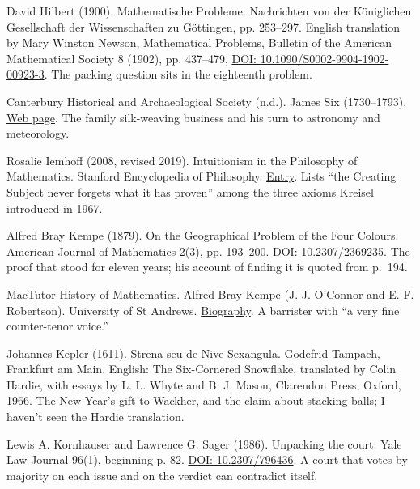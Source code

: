 \noindent David Hilbert (1900). Mathematische Probleme. Nachrichten von der K\"oniglichen Gesellschaft der Wissenschaften zu G\"ottingen, pp. 253--297. English translation by Mary Winston Newson, Mathematical Problems, Bulletin of the American Mathematical Society 8 (1902), pp. 437--479, \href{https://doi.org/10.1090/S0002-9904-1902-00923-3}{DOI: 10.1090/S0002-9904-1902-00923-3}. The packing question sits in the eighteenth problem.
\par\medskip

\noindent Canterbury Historical and Archaeological Society (n.d.). James Six (1730--1793). \href{https://www.canterbury-archaeology.org.uk/six-james-biog}{Web page}. The family silk-weaving business and his turn to astronomy and meteorology.
\par\medskip

\noindent Rosalie Iemhoff (2008, revised 2019). Intuitionism in the Philosophy of Mathematics. Stanford Encyclopedia of Philosophy. \href{https://plato.stanford.edu/entries/intuitionism/}{Entry}. Lists ``the Creating Subject never forgets what it has proven'' among the three axioms Kreisel introduced in 1967.
\par\medskip

\noindent Alfred Bray Kempe (1879). On the Geographical Problem of the Four Colours. American Journal of Mathematics 2(3), pp. 193--200. \href{https://doi.org/10.2307/2369235}{DOI: 10.2307/2369235}. The proof that stood for eleven years; his account of finding it is quoted from p.~194.
\par\medskip

\noindent MacTutor History of Mathematics. Alfred Bray Kempe (J. J. O'Connor and E. F. Robertson). University of St Andrews. \href{https://mathshistory.st-andrews.ac.uk/Biographies/Kempe/}{Biography}. A barrister with ``a very fine counter-tenor voice.''
\par\medskip

\noindent Johannes Kepler (1611). Strena seu de Nive Sexangula. Godefrid Tampach, Frankfurt am Main. English: The Six-Cornered Snowflake, translated by Colin Hardie, with essays by L. L. Whyte and B. J. Mason, Clarendon Press, Oxford, 1966. The New Year's gift to Wackher, and the claim about stacking balls; I haven't seen the Hardie translation.
\par\medskip

\noindent Lewis A. Kornhauser and Lawrence G. Sager (1986). Unpacking the court. Yale Law Journal 96(1), beginning p. 82. \href{https://doi.org/10.2307/796436}{DOI: 10.2307/796436}. A court that votes by majority on each issue and on the verdict can contradict itself.
\par\medskip

